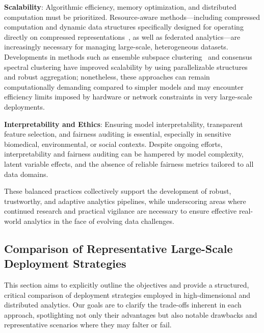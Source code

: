 \documentclass[sigconf]{acmart}
\begin{document}
\textbf{Scalability}: Algorithmic efficiency, memory optimization, and distributed computation must be prioritized. Resource-aware methods—including compressed computation and dynamic data structures specifically designed for operating directly on compressed representations~\cite{ref118}, as well as federated analytics—are increasingly necessary for managing large-scale, heterogeneous datasets. Developments in methods such as ensemble subspace clustering~\cite{ref116} and consensus spectral clustering have improved scalability by using parallelizable structures and robust aggregation; nonetheless, these approaches can remain computationally demanding compared to simpler models and may encounter efficiency limits imposed by hardware or network constraints in very large-scale deployments.

\textbf{Interpretability and Ethics}: Ensuring model interpretability, transparent feature selection, and fairness auditing is essential, especially in sensitive biomedical, environmental, or social contexts. Despite ongoing efforts, interpretability and fairness auditing can be hampered by model complexity, latent variable effects, and the absence of reliable fairness metrics tailored to all data domains.

These balanced practices collectively support the development of robust, trustworthy, and adaptive analytics pipelines, while underscoring areas where continued research and practical vigilance are necessary to ensure effective real-world analytics in the face of evolving data challenges.

\subsection{Comparison of Representative Large-Scale Deployment Strategies}

This section aims to explicitly outline the objectives and provide a structured, critical comparison of deployment strategies employed in high-dimensional and distributed analytics. Our goals are to clarify the trade-offs inherent in each approach, spotlighting not only their advantages but also notable drawbacks and representative scenarios where they may falter or fail.
\end{document}

